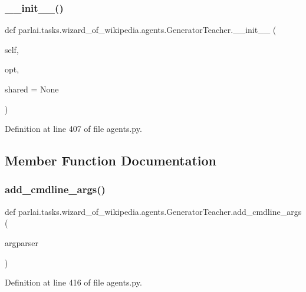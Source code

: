 \subsubsection{\texorpdfstring{\+\_\+\+\_\+init\+\_\+\+\_\+()}{\_\_init\_\_()}}
{\footnotesize\ttfamily def parlai.\+tasks.\+wizard\+\_\+of\+\_\+wikipedia.\+agents.\+Generator\+Teacher.\+\_\+\+\_\+init\+\_\+\+\_\+ (\begin{DoxyParamCaption}\item[{}]{self,  }\item[{}]{opt,  }\item[{}]{shared = {\ttfamily None} }\end{DoxyParamCaption})}



Definition at line 407 of file agents.\+py.



\subsection{Member Function Documentation}
\mbox{\label{classparlai_1_1tasks_1_1wizard__of__wikipedia_1_1agents_1_1GeneratorTeacher_ae23cc01ce296734fbb1d23d8cb3ca81f}} 
\subsubsection{\texorpdfstring{add\+\_\+cmdline\+\_\+args()}{add\_cmdline\_args()}}
{\footnotesize\ttfamily def parlai.\+tasks.\+wizard\+\_\+of\+\_\+wikipedia.\+agents.\+Generator\+Teacher.\+add\+\_\+cmdline\+\_\+args (\begin{DoxyParamCaption}\item[{}]{argparser }\end{DoxyParamCaption})\hspace{0.3cm}{\ttfamily [static]}}



Definition at line 416 of file agents.\+py.

